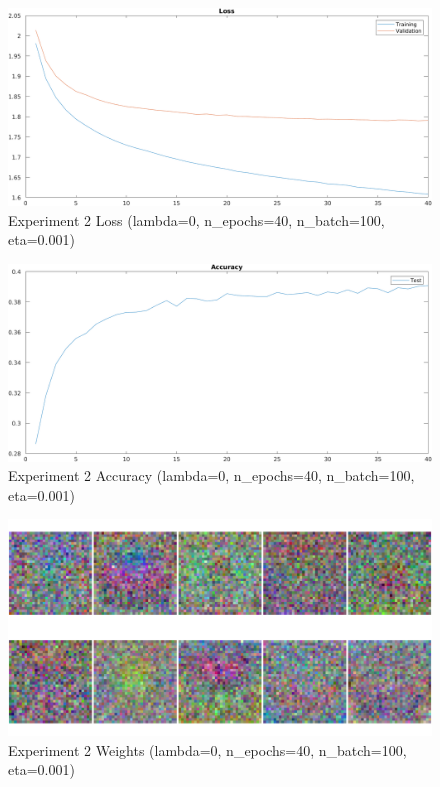     \begin{figure}[ht]
        \includegraphics[width=\textwidth]{../code/result_pics/lambda=0, n_epochs=40, n_batch=100, eta=.001/loss.png}
        \caption{Experiment 2 Loss (lambda=0, n\_epochs=40, n\_batch=100, eta=0.001)}
        \label{fig:loss2}
    \end{figure}

    \begin{figure}[ht]
        \includegraphics[width=\textwidth]{../code/result_pics/lambda=0, n_epochs=40, n_batch=100, eta=.001/accuracy.png}
        \caption{Experiment 2 Accuracy (lambda=0, n\_epochs=40, n\_batch=100, eta=0.001)}
        \label{fig:accuracy2}
    \end{figure}

    \begin{figure}[ht]
        \includegraphics[width=\textwidth]{../code/result_pics/lambda=0, n_epochs=40, n_batch=100, eta=.001/weights.png}
        \caption{Experiment 2 Weights (lambda=0, n\_epochs=40, n\_batch=100, eta=0.001)}
        \label{fig:weights2}
    \end{figure}

